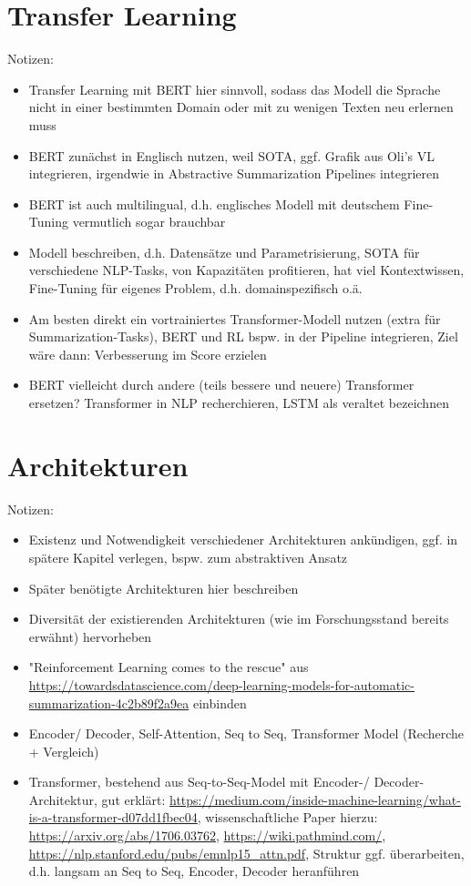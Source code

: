 \section{Transfer Learning}
Notizen:
\begin{itemize}
	\item Transfer Learning mit BERT hier sinnvoll, sodass das Modell die Sprache nicht in einer bestimmten Domain oder mit zu wenigen Texten neu erlernen muss
	\item BERT zunächst in Englisch nutzen, weil SOTA, ggf. Grafik aus Oli's VL integrieren, irgendwie in Abstractive Summarization Pipelines integrieren
	\item BERT ist auch multilingual, d.h. englisches Modell mit deutschem Fine-Tuning vermutlich sogar brauchbar
	\item Modell beschreiben, d.h. Datensätze und Parametrisierung, SOTA für verschiedene NLP-Tasks, von Kapazitäten profitieren, hat viel Kontextwissen, Fine-Tuning für eigenes Problem, d.h. domainspezifisch o.ä.
	\item Am besten direkt ein vortrainiertes Transformer-Modell nutzen (extra für Summarization-Tasks), BERT und RL bspw. in der Pipeline integrieren, Ziel wäre dann: Verbesserung im Score erzielen
	\item BERT vielleicht durch andere (teils bessere und neuere) Transformer ersetzen? Transformer in NLP recherchieren, LSTM als veraltet bezeichnen
\end{itemize}


\section{Architekturen}
Notizen:
\begin{itemize}
	\item Existenz und Notwendigkeit verschiedener Architekturen ankündigen, ggf. in spätere Kapitel verlegen, bspw. zum abstraktiven Ansatz
	\item Später benötigte Architekturen hier beschreiben
	\item Diversität der existierenden Architekturen (wie im Forschungsstand bereits erwähnt) hervorheben
	\item "Reinforcement Learning comes to the rescue" aus \url{https://towardsdatascience.com/deep-learning-models-for-automatic-summarization-4c2b89f2a9ea} einbinden
	\item Encoder/ Decoder, Self-Attention, Seq to Seq, Transformer Model (Recherche + Vergleich)
	\item Transformer, bestehend aus Seq-to-Seq-Model mit Encoder-/ Decoder-Architektur, gut erklärt: \url{https://medium.com/inside-machine-learning/what-is-a-transformer-d07dd1fbec04}, wissenschaftliche Paper hierzu: \url{https://arxiv.org/abs/1706.03762}, \url{https://wiki.pathmind.com/}, \url{https://nlp.stanford.edu/pubs/emnlp15_attn.pdf}, Struktur ggf. überarbeiten, d.h. langsam an Seq to Seq, Encoder, Decoder heranführen
\end{itemize}


